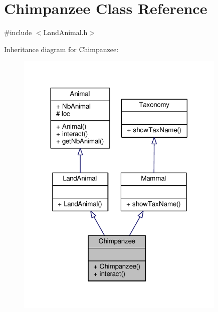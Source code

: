 \hypertarget{classChimpanzee}{}\section{Chimpanzee Class Reference}
\label{classChimpanzee}


{\ttfamily \#include $<$Land\+Animal.\+h$>$}



Inheritance diagram for Chimpanzee\+:
\nopagebreak
\begin{figure}[H]
\begin{center}
\leavevmode
\includegraphics[width=284pt]{classChimpanzee__inherit__graph}
\end{center}
\end{figure}


